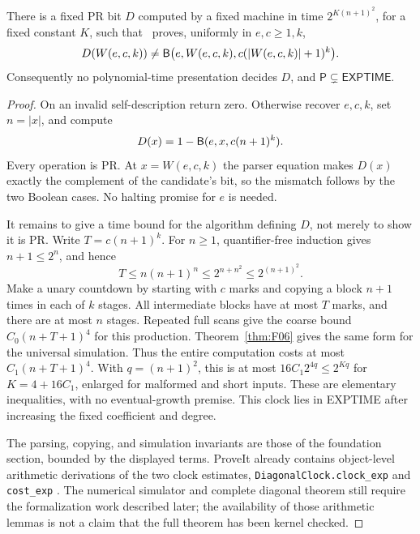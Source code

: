 \begin{theorem}\label{thm:H01}
There is a fixed PR bit $D$ computed by a fixed machine in time $2^{K(n+1)^2}$, for a fixed constant $K$, such that \ipra\ proves, uniformly in $e,c\ge1,k$,
\[
 D(W(e,c,k))\ne
 \mathsf B\bigl(e,W(e,c,k),c(|W(e,c,k)|+1)^k\bigr).
\]
Consequently no polynomial-time presentation decides $D$, and $\mathsf P\subsetneq\mathsf{EXPTIME}$.
\end{theorem}
\begin{proof}
On an invalid self-description return zero. Otherwise recover $e,c,k$, set $n=|x|$, and compute
\[
 D(x)=1-\mathsf B(e,x,c(n+1)^k).
\]
Every operation is PR. At $x=W(e,c,k)$ the parser equation makes $D(x)$ exactly the complement of the candidate's bit, so the mismatch follows by the two Boolean cases. No halting promise for $e$ is needed.

It remains to give a time bound for the algorithm defining $D$, not merely to show it is PR. Write $T=c(n+1)^k$. For $n\ge1$, quantifier-free induction gives $n+1\le2^n$, and hence
\[
 T\le n(n+1)^n\le2^{n+n^2}\le2^{(n+1)^2}.
\]
Make a unary countdown by starting with $c$ marks and copying a block $n+1$ times in each of $k$ stages. All intermediate blocks have at most $T$ marks, and there are at most $n$ stages. Repeated full scans give the coarse bound $C_0(n+T+1)^4$ for this production. Theorem~\ref{thm:F06} gives the same form for the universal simulation. Thus the entire computation costs at most $C_1(n+T+1)^4$. With $q=(n+1)^2$, this is at most $16C_1 2^{4q}\le2^{Kq}$ for $K=4+16C_1$, enlarged for malformed and short inputs. These are elementary inequalities, with no eventual-growth premise. This clock lies in EXPTIME after increasing the fixed coefficient and degree.

The parsing, copying, and simulation invariants are those of the foundation section, bounded by the displayed terms. ProveIt already contains object-level arithmetic derivations of the two clock estimates, \texttt{DiagonalClock.clock\_exp} and \texttt{cost\_exp} \cite{ProveItDiagonal}. The numerical simulator and complete diagonal theorem still require the formalization work described later; the availability of those arithmetic lemmas is not a claim that the full theorem has been kernel checked.
\end{proof}

